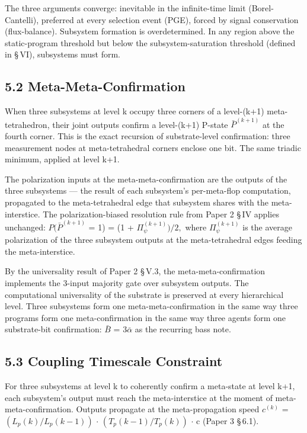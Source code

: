 \documentclass[11pt,oneside]{report}
\theoremstyle{definition}
\theoremstyle{remark}
\begin{document}
The three arguments converge: inevitable in the infinite-time limit
(Borel-Cantelli), preferred at every selection event (PGE), forced by
signal conservation (flux-balance). Subsystem formation is
overdetermined. In any region above the static-program threshold but
below the subsystem-saturation threshold (defined in \S\,VI), subsystems
must form.

\subsection*{5.2 Meta-Meta-Confirmation}

When three subsystems at level k occupy three corners of a level-(k+1)
meta-tetrahedron, their joint outputs confirm a level-(k+1) P-state
\ensuremath{\bar{P}^{(k+1)}} at the fourth corner. This is the exact recursion of
substrate-level confirmation: three measurement nodes at
meta-tetrahedral corners enclose one bit. The same triadic minimum,
applied at level k+1.

The polarization inputs at the meta-meta-confirmation are the outputs of
the three subsystems --- the result of each subsystem's per-meta-flop
computation, propagated to the meta-tetrahedral edge that subsystem
shares with the meta-interstice. The polarization-biased resolution rule
from Paper 2 \S\,IV applies unchanged: \ensuremath{P(\bar{P}^{(k+1)}} = 1) = (1 +
\ensuremath{\Pi_{\psi}^{(k+1)})/2,} where \ensuremath{\Pi_{\psi}^{(k+1)}} is the average polarization of the
three subsystem outputs at the meta-tetrahedral edges feeding the
meta-interstice.

By the universality result of Paper 2 \S\,V.3, the meta-meta-confirmation
implements the 3-input majority gate over subsystem outputs. The
computational universality of the substrate is preserved at every
hierarchical level. Three subsystems form one meta-meta-confirmation in
the same way three programs form one meta-confirmation in the same way
three agents form one substrate-bit confirmation: \ensuremath{\bar{B}} = \ensuremath{3\bar{\alpha}} as the
recurring bass note.

\subsection*{5.3 Coupling Timescale Constraint}

For three subsystems at level k to coherently confirm a meta-state at
level k+1, each subsystem's output must reach the meta-interstice at the
moment of meta-meta-confirmation. Outputs propagate at the
meta-propagation speed \ensuremath{c^{(k)}} = \ensuremath{(L_{p}(k)/L_{p}(k-1))} \ensuremath{\cdot}
\ensuremath{(T_{p}(k-1)/T_{p}(k))} \ensuremath{\cdot} c (Paper 3 \S\,6.1).
\end{document}
